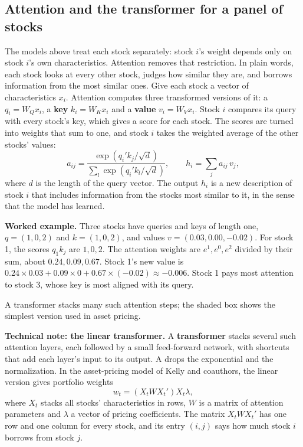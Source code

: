 \subsection{Attention and the transformer for a panel of stocks}

The models above treat each stock separately: stock $i$'s weight depends only on stock $i$'s own characteristics. Attention removes that restriction. In plain words, each stock looks at every other stock, judges how similar they are, and borrows information from the most similar ones. Give each stock a vector of characteristics $x_i$. Attention computes three transformed versions of it: a  $q_i = W_Q x_i$, a \textbf{key} $k_i = W_K x_i$ and a \textbf{value} $v_i = W_V x_i$. Stock $i$ compares its query with every stock's key, which gives a score for each stock. The scores are turned into weights that sum to one, and stock $i$ takes the weighted average of the other stocks' values:
\begin{equation}
  a_{ij} = \frac{\exp\left(q_i' k_j/\sqrt{d}\right)}{\sum_{l} \exp\left(q_i' k_l/\sqrt{d}\right)}, \qquad h_i = \sum_{j} a_{ij}\, v_j,
  \label{eq:22-attention}
\end{equation}
where $d$ is the length of the query vector. The output $h_i$ is a new description of stock $i$ that includes information from the stocks most similar to it, in the sense that the model has learned.

\textbf{Worked example.} Three stocks have queries and keys of length one, $q = (1, 0, 2)$ and $k = (1, 0, 2)$, and values $v = (0.03, 0.00, -0.02)$. For stock 1, the scores $q_1 k_j$ are $1, 0, 2$. The attention weights are $e^1, e^0, e^2$ divided by their sum, about $0.24, 0.09, 0.67$. Stock 1's new value is $0.24 \times 0.03 + 0.09 \times 0 + 0.67 \times (-0.02) \approx -0.006$. Stock 1 pays most attention to stock 3, whose key is most aligned with its query.

A transformer stacks many such attention steps; the shaded box shows the simplest version used in asset pricing.

\begin{technote}
\textbf{Technical note: the linear transformer.} A \textbf{transformer} stacks several such attention layers, each followed by a small feed-forward network, with shortcuts that add each layer's input to its output. A  drops the exponential and the normalization. In the asset-pricing model of Kelly and coauthors, the linear version gives portfolio weights
\begin{equation}
  w_t = \left(X_t W X_t'\right) X_t \lambda,
  \label{eq:22-linear}
\end{equation}
where $X_t$ stacks all stocks' characteristics in rows, $W$ is a matrix of attention parameters and $\lambda$ a vector of pricing coefficients. The matrix $X_t W X_t'$ has one row and one column for every stock, and its entry $(i,j)$ says how much stock $i$ borrows from stock $j$.
\end{technote}

